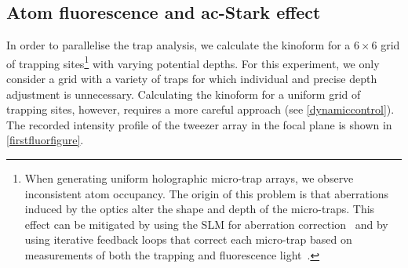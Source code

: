 \documentclass[../Thesis-IJspeert.tex]{subfiles}
\begin{document}
\subsection{Atom fluorescence and ac-Stark effect}
\label{stark}
In order to parallelise the trap analysis, we calculate the kinoform for a $6\times6$ grid of trapping sites\footnote{When generating uniform holographic micro-trap arrays, we observe inconsistent atom occupancy. The origin of this problem is that aberrations induced by the optics alter the shape and depth of the micro-traps. This effect can be mitigated by using the SLM for aberration correction~\cite{imr2010,Kim2019} and by using iterative feedback loops that correct each micro-trap based on measurements of both the trapping and fluorescence light~\cite{Tamura2016}.} with varying potential depths. For this experiment, we only consider a grid with a variety of traps for which individual and precise depth adjustment is unnecessary. Calculating the kinoform for a uniform grid of trapping sites, however, requires a more careful approach (see \autoref{dynamiccontrol}). The recorded intensity profile of the tweezer array in the focal plane is shown in \autoref{firstfluorfigure}.
\end{document}
